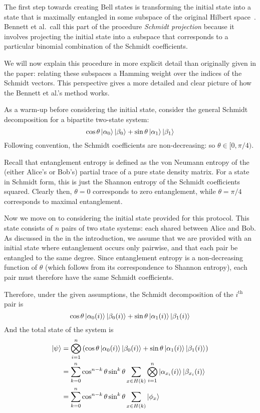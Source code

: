 The first step towards creating Bell states is transforming the initial state into a state that is maximally entangled in some subspace of the original Hilbert space~\cite{bennett1996concentrating}.
Bennett et al.\ call this part of the procedure \emph{Schmidt projection} because it involves projecting the initial state into a subspace that corresponds to a particular binomial combination of the Schmidt coefficients.

We will now explain this procedure in more explicit detail than originally given in the paper: relating these subspaces a Hamming weight over the indices of the Schmidt vectors. 
This perspective gives a more detailed and clear picture of how the Bennett et al.'s method works.

As a warm-up before considering the initial state, consider the general Schmidt decomposition for a bipartite two-state system:
$$
\cos\theta \ket{\alpha_0} \ket{\beta_0} + 
\sin\theta \ket{\alpha_1} \ket{\beta_1}
$$
Following convention, the Schmidt coefficients are non-decreasing: so $\theta \in [0, \pi/4)$.

Recall that entanglement entropy is defined as the von Neumann entropy of the (either Alice's or Bob's) partial trace of a pure state density matrix.
For a state in Schmidt form, this is just the Shannon entropy of the Schmidt coefficients squared.
Clearly then, $\theta = 0$ corresponds to zero entanglement, while $\theta = \pi/4$ corresponds to maximal entanglement.

Now we move on to considering the initial state provided for this protocol. This state consists of $n$ pairs of two state systems: each shared between Alice and Bob. As discussed in the in the introduction, we assume that we are provided with an initial state where entanglement occurs only pairwise, and that each pair be entangled to the same degree. Since entanglement entropy is a non-decreasing function of $\theta$  (which follows from its correspondence to Shannon entropy), each pair must therefore have the same Schmidt coefficients.

Therefore, under the given assumptions, the Schmidt decomposition of the $i^{\text{th}}$ pair is  
$$
\cos\theta \ket{\alpha_0(i)} \ket{\beta_0(i)} + 
\sin\theta \ket{\alpha_1(i)} \ket{\beta_1(i)}
$$
And the total state of the system is
\begin{align*}
	\ket{\psi} &= \bigotimes_{i=1}^n \left( 
	\cos\theta \ket{\alpha_0(i)} \ket{\beta_0(i)} + 
	\sin\theta \ket{\alpha_1(i)} \ket{\beta_1(i)} \right) \\
	&= \sum_{k=0}^n \cos^{n-k}\theta \sin^k\theta
	\sum_{x \in H(k)} \bigotimes_{i=1}^n 
	\ket{\alpha_{x_i}(i)} \ket{\beta_{x_i}(i)} \\
	&=  \sum_{k=0}^n \cos^{n-k}\theta \sin^k\theta
	\sum_{x \in H(k)} \ket{\phi_x}
\end{align*}

